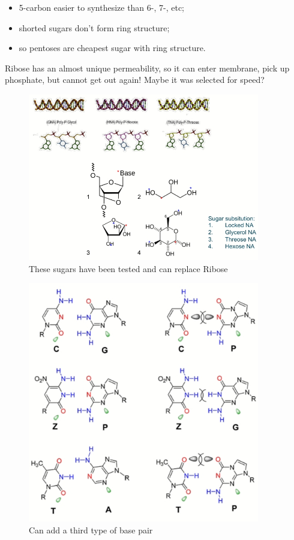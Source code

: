 \documentclass[]{article}
\begin{document}
\begin{itemize}
	\item 5-carbon easier to synthesize than 6-, 7-, etc;
	\item shorted sugars don't form ring structure;
	\item so pentoses are cheapest sugar with ring structure.
\end{itemize}

Ribose has an almost unique permeability, so it can enter membrane, pick up phosphate, but cannot get out again! Maybe it was selected for speed?

\begin{figure}[H]
	\caption{These sugars have been tested and can replace Ribose} \label{fig:AlternativeSugars} 
	\includegraphics[width=0.9\textwidth]{AlternativeSugars}
\end{figure}

\begin{figure}[H]
	\caption{Can add a third type of base pair} \label{fig:ExpandGeneticCode} 
	\includegraphics[width=0.9\textwidth]{ExpandGeneticCode}
\end{figure}
\end{document}
